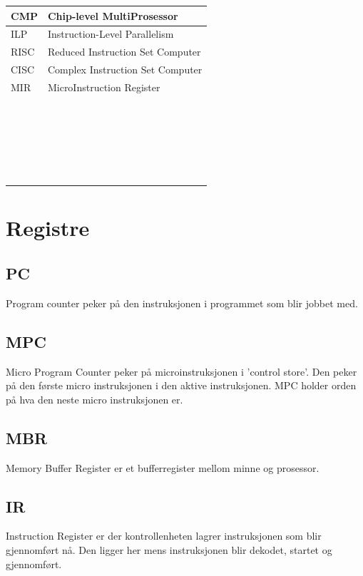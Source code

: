 \documentclass[a4paper, 10pt]{article}
\begin{document}
\begin{tabular}{|l|l|}
    CMP         & Chip-level MultiProsessor        \\ \hline
    ILP         & Instruction-Level Parallelism    \\ \hline
    RISC        & Reduced Instruction Set Computer \\ \hline
    CISC        & Complex Instruction Set Computer \\ \hline
    MIR         & MicroInstruction Register        \\ \hline
    ~           & ~                                \\ \hline
    ~           & ~                                \\ \hline
    ~           & ~                                \\ \hline
    ~           & ~                                \\ \hline
    ~           & ~                                \\ \hline
    \end{tabular}
\newpage    
   
\section{Registre}
\subsection{PC}
Program counter peker på den instruksjonen i programmet som blir jobbet med.

\subsection{MPC}
Micro Program Counter peker på microinstruksjonen i 'control store'.  Den peker på den første micro instruksjonen i den aktive instruksjonen. MPC holder orden på hva den neste micro instruksjonen er.

\subsection{MBR}
Memory Buffer Register er et bufferregister mellom minne og prosessor.

\subsection{IR}
Instruction Register er der kontrollenheten lagrer instruksjonen som blir gjennomført nå. Den ligger her mens instruksjonen blir dekodet, startet og gjennomført.
\end{document}
